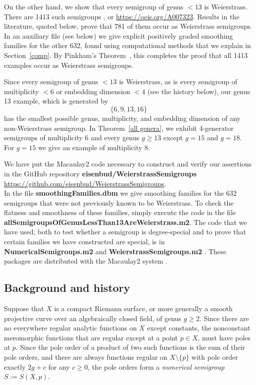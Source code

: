 \documentclass[twoside,12pt, leqno]{amsart}
\theoremstyle{definition}
\begin{document}
On the other hand, we show that every semigroup of genus $<13$ is Weierstrass. There are 1413 such semigroups \cite{NumericalSemigroupsSource}, or \url{https://oeis.org/A007323}. Results in the literature, quoted below, prove that 781 of them occur as
Weierstrass semigroups. In an auxiliary file (see below) we give explicit positively graded smoothing families
for the other 632, found using computational methods that we explain in Section~\ref{comp}. By
Pinkham's Theorem~\cite{MR376672}, this completes the proof that all 1413 examples occur
as Weierstrass semigroups.

Since every semigroup of genus $<13$ is Weierstrass, as is every semigroup of multiplicity $<6$ or embedding dimension $<4$ (see the history below),  our genus 13 example, which is generated by 
$$
\{6,9,13,16\}
$$
 has the smallest possible genus, multiplicity, and embedding dimension of any non-Weierstrass semigroup. In Theorem~\ref{all genera}, we exhibit 4-generator semigroups of multiplicity 6 and
 every genus $g \geq 13$ except $g=15$ and $g=18$. For $g=15$ we give an example of
 multiplicity 8.

We have put the Macaulay2 code necessary to construct and verify our assertions in the
GitHub repository {\bf eisenbud/WeierstrassSemigroups} \\ \url{https://github.com/eisenbud/WeierstrassSemigroups}.\\
In the file {\bf smoothingFamilies.dbm} we give smoothing families for the 632 semigroups that were not previously known to be Weierstrass.
To check the flatness and smoothness
of these families, simply execute the code in the file 
{\bf allSemigroupsOfGenusLessThan13AreWeierstrass.m2}.
The code that we have used, both to test whether a semigroup is degree-special and
to prove that certain families we have constructed are special, is in 
{\bf NumericalSemigroups.m2} \cite{NumericalSemigroupsSource} and {\bf WeierstrassSemigroups.m2} \cite{WeierstrassSemigroupsSource}. These packages
are distributed with the Macaulay2 system
\cite{M2}.

\subsection*{Background and history}
Suppose that $X$ is a compact Riemann surface, or more generally a smooth
projective curve over an algebraically closed field, of genus $g\geq 2$. Since there
are no everywhere regular analytic functions on $X$ except constants, the nonconstant
meromorphic functions
that are regular except at a point
$p\in X$, 
must have poles at $p$. Since the pole order of a product
of two such functions is the sum of their pole orders, and there are always functions
regular on $X\setminus \{p\}$ with
pole order exactly $2g +c$ for any $c \geq 0$, the pole orders form
a \emph{numerical semigroup} $S := S(X,p)$. 
\end{document}

